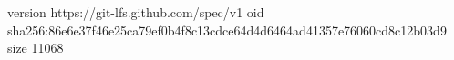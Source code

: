 version https://git-lfs.github.com/spec/v1
oid sha256:86e6e37f46e25ca79ef0b4f8c13cdce64d4d6464ad41357e76060cd8c12b03d9
size 11068
